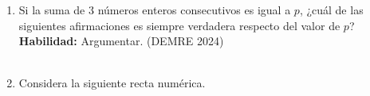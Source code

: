 \documentclass[11pt,letterpaper]{article}
\newenvironment{alternativas}{%
\begin{enumerate}[label=\Alph*), leftmargin=14pt, itemsep=2pt, topsep=2pt]
}{\end{enumerate}}
\begin{document}
\begin{enumerate}[label=\textbf{\arabic*.}, leftmargin=*, itemsep=8pt]
\item
\begin{minipage}[t]{\linewidth}
Si la suma de 3 números enteros consecutivos es igual a $p$, ¿cuál de las siguientes afirmaciones es siempre verdadera respecto del valor de $p$?\\
\textbf{Habilidad:} Argumentar. (DEMRE 2024)\\
\\%
\begin{minipage}{\linewidth}
\vspace{7mm}
\end{minipage}
\vspace{7mm}
\end{minipage}

\item
\begin{minipage}[t]{\linewidth}
Considera la siguiente recta numérica.\\


\end{minipage}
\end{enumerate}
\end{document}
